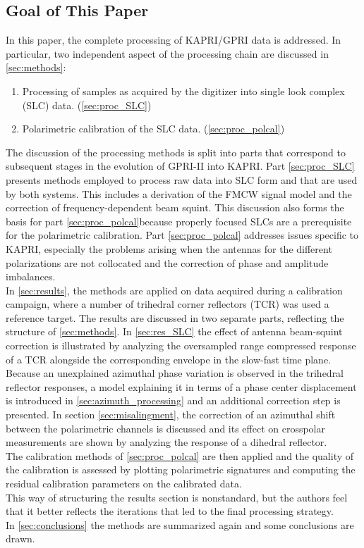 \subsection{Goal of This Paper}
In this paper, the complete processing of KAPRI/GPRI data is addressed. In particular, two independent aspect of the processing chain are discussed in \autoref{sec:methods}:
\begin{enumerate}
	\item Processing of samples as acquired by the digitizer into single look complex (SLC) data. (\autoref{sec:proc_SLC})
	\item Polarimetric calibration of the SLC data. (\autoref{sec:proc_polcal})
\end{enumerate}
The discussion of the processing methods is split into parts that correspond to subsequent stages in the evolution of GPRI-II into KAPRI. Part \ref{sec:proc_SLC} presents  methods employed to process raw data into SLC form and that are used by both systems. This includes a derivation of the FMCW signal model and the correction of frequency-dependent beam squint. This discussion also forms the basis for part \ref{sec:proc_polcal}because properly focused SLCs  are a prerequisite for the polarimetric calibration. Part \ref{sec:proc_polcal} addresses issues specific to KAPRI, especially the problems arising when the antennas for the different polarizations are not collocated and the correction of phase and amplitude imbalances.\\
In \autoref{sec:results}, the methods are applied on data acquired during a calibration campaign, where a number of trihedral corner reflectors (TCR) was used a reference target. The results are discussed in two separate parts, reflecting the structure of \autoref{sec:methods}. In \autoref{sec:res_SLC} the effect of antenna beam-squint correction is illustrated by analyzing the oversampled range compressed response of a TCR alongside the corresponding envelope in the slow-fast time plane. Because an unexplained azimuthal phase variation is observed in the trihedral reflector responses, a model explaining it in terms of a phase center displacement is introduced in \autoref{sec:azimuth_processing} and an additional correction step is presented. In section \ref{sec:misalingment}, the correction of an azimuthal shift between the polarimetric channels is discussed and its effect on crosspolar measurements are shown by analyzing the response of a dihedral reflector.\\
The calibration methods of \ref{sec:proc_polcal} are then applied  and the quality of the calibration is assessed by plotting polarimetric signatures and computing the residual calibration parameters on the calibrated data.\\ This way of structuring the results section is nonstandard, but the authors feel that it better reflects the iterations that led to the final processing strategy.\\
In \autoref{sec:conclusions} the methods are summarized again and some conclusions are drawn.